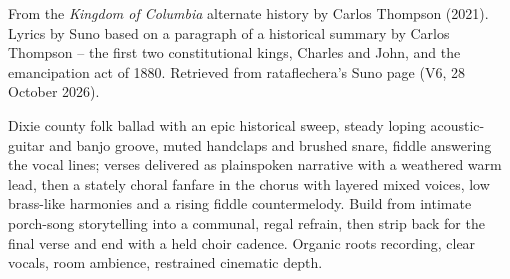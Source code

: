 
\begin{notes}
From the \emph{Kingdom of Columbia} alternate history by Carlos Thompson (2021). Lyrics by Suno based on a paragraph of a historical summary by Carlos Thompson -- the first two constitutional kings, Charles and John, and the emancipation act of 1880. Retrieved from rataflechera's Suno page (V6, 28 October 2026).
\end{notes}
\begin{style}
Dixie county folk ballad with an epic historical sweep, steady loping acoustic-guitar and banjo groove, muted handclaps and brushed snare, fiddle answering the vocal lines; verses delivered as plainspoken narrative with a weathered warm lead, then a stately choral fanfare in the chorus with layered mixed voices, low brass-like harmonies and a rising fiddle countermelody. Build from intimate porch-song storytelling into a communal, regal refrain, then strip back for the final verse and end with a held choir cadence. Organic roots recording, clear vocals, room ambience, restrained cinematic depth.
\end{style}
